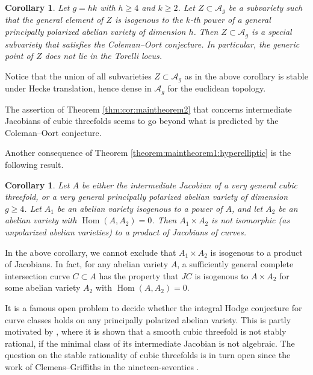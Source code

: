 \documentclass[a4paper,11pt,reqno]{amsart}
\numberwithin{equation}{section}
\theoremstyle{plain}
\newtheorem{corollary}[theorem]{Corollary}
\theoremstyle{definition}
\newcommand{\Hom}{\operatorname{Hom}}
\newcommand{\ca}[1]{{\mathcal{#1}}}
\begin{document}
\begin{corollary} \label{cor:coleman-oort}
Let $g = hk$ with $h \geq 4$ and $k\geq 2$. Let $Z \subset \ca A_g$ be a subvariety such that the general element of $Z$ is isogenous to the $k$-th power of a general principally polarized abelian variety of dimension $h$. Then $Z \subset \ca A_g$ is a special subvariety that satisfies the Coleman--Oort conjecture. In particular, the generic point of $Z$ does not lie in the Torelli locus.
\end{corollary}

Notice that the union of all subvarieties $Z \subset \ca A_g$ as in the above corollary is stable under Hecke translation, hence dense in $\ca A_g$ for the euclidean topology. 

The assertion of Theorem \ref{thm:cor:maintheorem2} that concerns intermediate Jacobians of cubic threefolds seems to go beyond what is predicted by the Coleman--Oort conjecture. 

Another consequence of Theorem \ref{theorem:maintheorem1:hyperelliptic} is the following result. 
 

\begin{corollary} \label{corollary:IHCconsequence}
Let $A$ be either the intermediate Jacobian of a very general cubic threefold, or a very general principally polarized abelian variety of dimension $g \geq 4$. Let $A_1$ be an abelian variety isogenous to a power of $A$, and let $A_2$ be an abelian variety with $\Hom(A,A_2) = 0$. Then $A_1 \times A_2$ is not isomorphic (as unpolarized abelian varieties) to a product of Jacobians of curves.
\end{corollary}

In the above corollary, we cannot exclude that $A_1\times A_2$ is isogenous to a product of Jacobians. In fact, for any abelian variety $A$, a sufficiently general complete intersection curve $C\subset A$ has the property that $JC$ is isogenous to $A\times A_2$ for some abelian variety $A_2$ with $\Hom(A,A_2)=0$.

It is a famous open problem to decide whether the integral Hodge conjecture for curve classes holds on any principally polarized abelian variety. 
This is partly motivated by \cite{voisin-universalCHgroup}, where it is shown that a smooth cubic threefold is not stably rational, if the minimal class of its intermediate Jacobian is not algebraic.
The question on the stable rationality of cubic threefolds is in turn open since the work of Clemens--Griffiths in the nineteen-seventies \cite{clemensgriffiths-cubicthreefold}.
\end{document}
